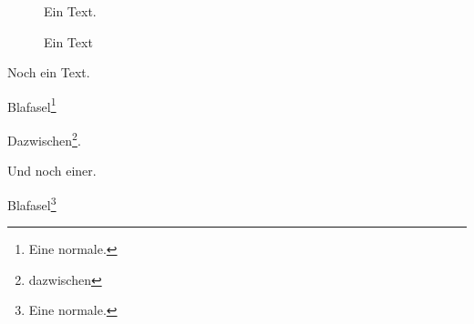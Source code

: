 \documentclass[a5paper]{scrartcl}
\begin{document}
\begin{figure}[htbp]
  \centering
  Ein Text\footnotemark[1].
  
  \caption{Ein Text}
\label{fig:foo}
\end{figure}

Noch ein Text\footnotemark.

Blafasel\footnote{Eine normale.}\saveFN{\foo}

Dazwischen\footnote{dazwischen}.

Und noch einer\useFN{\foo}.

Blafasel\footnote{Eine normale.}
\end{document}
